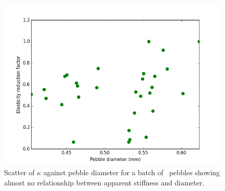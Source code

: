 \begin{figure}[!ht]
\centering
    \includegraphics[width=\doubleimagewidth]{chapters/figures/fzk-kappa-dp-scatter.png}
    \caption{Scatter of $\kappa$ against pebble diameter for a batch of \lis~pebbles showing almost no relationship between apparent stiffness and diameter.}
    \label{fig:fzk-kappa-dp-scatter}
\end{figure}

